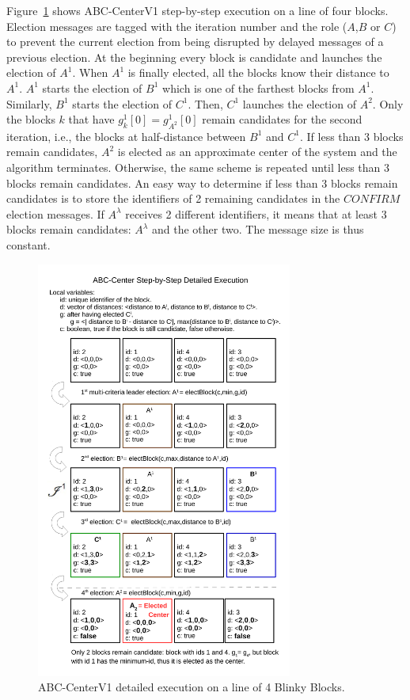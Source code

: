 Figure~\ref{abc-center-illustration} shows ABC-CenterV1 step-by-step execution on a line of four blocks. Election messages are tagged with the iteration number and the role ($A$,$B$ or $C$) to prevent the current election from being disrupted by delayed messages of a previous election. At the beginning every block is candidate and launches the election of $A^1$. When $A^1$ is finally elected, all the blocks know their distance to $A^1$. $A^1$ starts the election of $B^1$ which is one of the farthest blocks from $A^1$. Similarly, $B^1$ starts the election of $C^1$. Then, $C^1$ launches the election of $A^2$. Only the blocks $k$ that have $g^1_k[0] = g^1_{A^2}[0]$ remain candidates for the second iteration, i.e., the blocks at half-distance between $B^1$ and $C^1$. If less than 3 blocks remain candidates, $A^2$ is elected as an approximate center of the system and the algorithm terminates. Otherwise, the same scheme is repeated until less than 3 blocks remain candidates. An easy way to determine if less than 3 blocks remain candidates is to store the identifiers of 2 remaining candidates in the $\mathit{CONFIRM}$ election messages. If $A^\lambda$ receives 2 different identifiers, it means that at least 3 blocks remain candidates: $A^\lambda$ and the other two. The message size is thus constant.

\begin{figure}[!h]
	\centering
	\includegraphics[width=0.75\textwidth]{images/centrality/abc-center-v1.pdf}
	\caption{ABC-CenterV1 detailed execution on a line of 4 Blinky Blocks.\label{abc-center-illustration}}
\end{figure}

